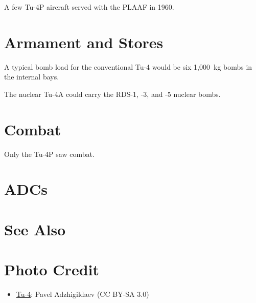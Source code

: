 A few Tu-4P aircraft served with the PLAAF in 1960.

\section{Armament and Stores}

A typical bomb load for the conventional Tu-4 would be six 1,000~kg bombs in the internal bays.

The nuclear Tu-4A could carry the RDS-1, -3, and -5 nuclear bombs.

\section{Combat}

Only the Tu-4P saw combat.

\section{ADCs}
\begin{adclist}
\end{adclist}

\section{See Also}
\begin{typelist}
\end{typelist}

\section{Photo Credit}
\begin{itemize}\raggedright
    \item \href{https://commons.wikimedia.org/wiki/File:TU-4-MONIN0.jpg}{Tu-4}: Pavel Adzhigildaev (CC BY-SA 3.0)
\end{itemize}
